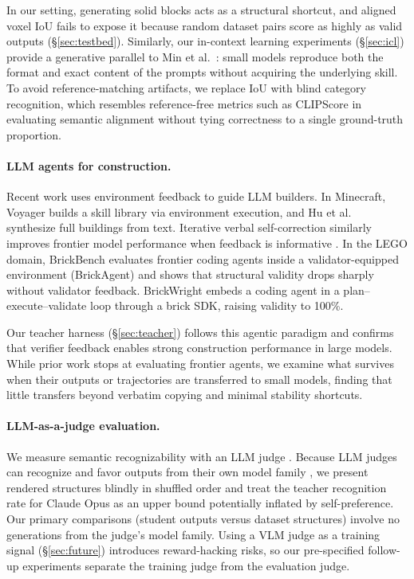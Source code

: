 \documentclass{article}
\begin{document}
In our setting, generating solid blocks acts as a structural shortcut, and aligned voxel IoU fails to expose it because random dataset pairs score as highly as valid outputs (\S\ref{sec:testbed}). Similarly, our in-context learning experiments (\S\ref{sec:icl}) provide a generative parallel to Min et al.\ \cite{min2022rethinking}: small models reproduce both the format and exact content of the prompts without acquiring the underlying skill. To avoid reference-matching artifacts, we replace IoU with blind category recognition, which resembles reference-free metrics such as CLIPScore \cite{hessel2021clipscore} in evaluating semantic alignment without tying correctness to a single ground-truth proportion.

\paragraph{LLM agents for construction.}
Recent work uses environment feedback to guide LLM builders. In Minecraft, Voyager \cite{wang2023voyager} builds a skill library via environment execution, and Hu et al.\ \cite{hu2024minecraft} synthesize full buildings from text. Iterative verbal self-correction similarly improves frontier model performance when feedback is informative \cite{madaan2023selfrefine,shinn2023reflexion}. In the LEGO domain, BrickBench \cite{kulits2026brickbench} evaluates frontier coding agents inside a validator-equipped environment (BrickAgent) and shows that structural validity drops sharply without validator feedback. BrickWright \cite{pun2026brickwright} embeds a coding agent in a plan--execute--validate loop through a brick SDK, raising validity to 100\%.

Our teacher harness (\S\ref{sec:teacher}) follows this agentic paradigm and confirms that verifier feedback enables strong construction performance in large models. While prior work stops at evaluating frontier agents, we examine what survives when their outputs or trajectories are transferred to small models, finding that little transfers beyond verbatim copying and minimal stability shortcuts.

\paragraph{LLM-as-a-judge evaluation.}
We measure semantic recognizability with an LLM judge \cite{zheng2023judging}. Because LLM judges can recognize and favor outputs from their own model family \cite{panickssery2024selfpref}, we present rendered structures blindly in shuffled order and treat the teacher recognition rate for Claude Opus as an upper bound potentially inflated by self-preference. Our primary comparisons (student outputs versus dataset structures) involve no generations from the judge's model family. Using a VLM judge as a training signal (\S\ref{sec:future}) introduces reward-hacking risks, so our pre-specified follow-up experiments separate the training judge from the evaluation judge.
\end{document}
